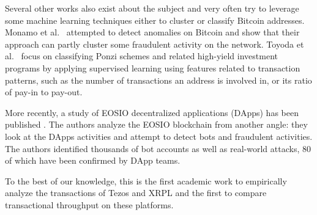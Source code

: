 Several other works also exist about the subject and very often try to leverage some machine learning techniques either to cluster or classify Bitcoin addresses. Monamo et al.~\cite{7802939} attempted to detect anomalies on Bitcoin and show that their approach can partly cluster some fraudulent activity on the network. Toyoda et al.~\cite{8254420} focus on classifying Ponzi schemes and related high-yield investment programs by applying supervised learning using features related to transaction patterns, such as the number of transactions an address is involved in, or its ratio of pay-in to pay-out. 

More recently, a study of EOSIO decentralized applications (DApps) has been published \cite{huang2020characterizing}.
The authors analyze the EOSIO blockchain from another angle: they look at the DApps activities and attempt to detect bots and fraudulent activities.
The authors identified thousands of bot accounts as well as real-world attacks, 80 of which have been confirmed by DApp teams.

To the best of our knowledge, this is the first academic work to empirically analyze the transactions of Tezos and XRPL and the first to compare transactional throughput on these platforms.
